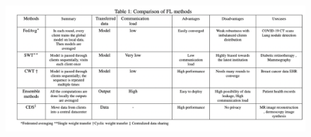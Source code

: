 


\begin{table}[h!]
\centering
\setlength{\tabcolsep}{8pt}
\renewcommand\arraystretch{1.4}






\label{table_core} 
\end{table}

\begin{figure}[t!]
 \centering
 \includegraphics[scale=0.55,angle=90,origin=c]{Chapter3/Screenshot 2022-04-04 at 18.59.31.png}
 \label{fig:pgd-atta-comparison}
\end{figure}

